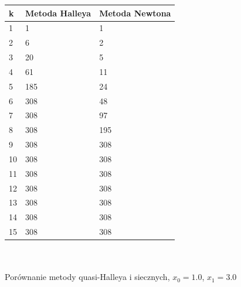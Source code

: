 \documentclass[11pt,a4paper]{article}
\begin{document}
    \begin{tabular}{|l|l|l|}
        \hline
        \textbf{k} & \textbf{Metoda Halleya} & \textbf{Metoda Newtona} \\
        \hline
        1 & 1 & 1 \\
        2 & 6 & 2 \\
        3 & 20 & 5 \\
        4 & 61 & 11 \\ 
        5 & 185 & 24 \\ 
        6 & 308 & 48 \\
        7 & 308 & 97 \\
        8 & 308 & 195 \\
        9 & 308 & 308 \\
        10 & 308 & 308 \\
        11 & 308 & 308 \\
        12 & 308 & 308 \\
        13 & 308 & 308 \\
        14 & 308 & 308 \\
        15 & 308 & 308 \\
        \hline
    \end{tabular}\\\\
    \newpage
    Porównanie metody quasi-Halleya i siecznych, $x_0 = 1.0$, $x_1 = 3.0$\\
\end{document}
